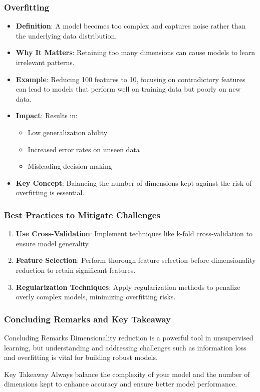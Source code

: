 \documentclass[aspectratio=169]{beamer}
\begin{document}
\begin{frame}[fragile]
    \frametitle{Overfitting}
    \begin{itemize}
        \item \textbf{Definition}: A model becomes too complex and captures noise rather than the underlying data distribution.
        
        \item \textbf{Why It Matters}: Retaining too many dimensions can cause models to learn irrelevant patterns.
        
        \item \textbf{Example}: Reducing 100 features to 10, focusing on contradictory features can lead to models that perform well on training data but poorly on new data.
        
        \item \textbf{Impact}: Results in:
        \begin{itemize}
            \item Low generalization ability
            \item Increased error rates on unseen data
            \item Misleading decision-making
        \end{itemize}
        
        \item \textbf{Key Concept}: Balancing the number of dimensions kept against the risk of overfitting is essential.
    \end{itemize}
\end{frame}

\begin{frame}[fragile]
    \frametitle{Best Practices to Mitigate Challenges}
    \begin{enumerate}
        \item \textbf{Use Cross-Validation}: Implement techniques like k-fold cross-validation to ensure model generality.
        \item \textbf{Feature Selection}: Perform thorough feature selection before dimensionality reduction to retain significant features.
        \item \textbf{Regularization Techniques}: Apply regularization methods to penalize overly complex models, minimizing overfitting risks.
    \end{enumerate}
\end{frame}

\begin{frame}[fragile]
    \frametitle{Concluding Remarks and Key Takeaway}
    \begin{block}{Concluding Remarks}
        Dimensionality reduction is a powerful tool in unsupervised learning, but understanding and addressing challenges such as information loss and overfitting is vital for building robust models.
    \end{block}
    
    \begin{block}{Key Takeaway}
        Always balance the complexity of your model and the number of dimensions kept to enhance accuracy and ensure better model performance.
    \end{block}
\end{frame}
\end{document}
